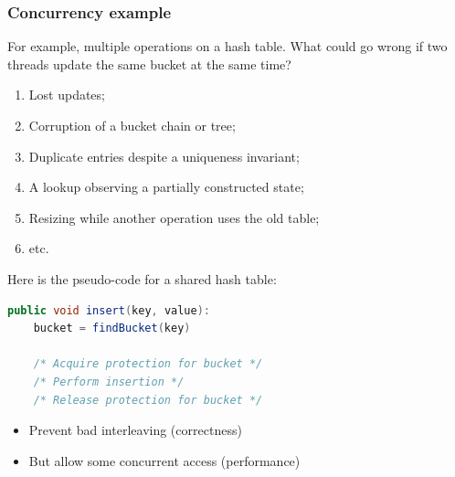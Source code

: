 \documentclass[11pt]{article}
\begin{document}
\subsubsection{Concurrency example}
For example, multiple operations on a hash table.
What could go wrong if two threads update the same bucket at the same time?
\begin{enumerate}
    \item Lost updates;
    \item Corruption of a bucket chain or tree;
    \item Duplicate entries despite a uniqueness invariant;
    \item A lookup observing a partially constructed state;
    \item Resizing while another operation uses the old table;
    \item etc.
\end{enumerate}
Here is the pseudo-code for a shared hash table:
\begin{lstlisting}[language=Java]
public void insert(key, value):
    bucket = findBucket(key)

    /* Acquire protection for bucket */
    /* Perform insertion */
    /* Release protection for bucket */
\end{lstlisting}
\begin{note}
\begin{itemize}
    \item Prevent bad interleaving (correctness)
    \item But allow some concurrent access (performance)
\end{itemize}
\end{note}
\end{document}
